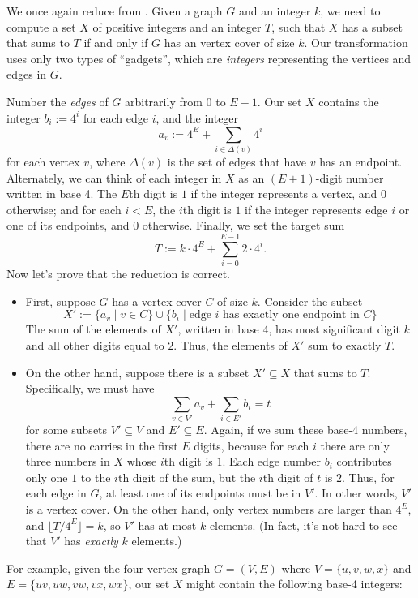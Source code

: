 We once again reduce from .
Given a graph $G$ and an integer $k$, we need to compute a set $X$ of positive integers and an integer $T$, such that $X$ has a subset that sums to $T$ if and only if $G$ has an vertex cover of size $k$.
Our transformation uses only two types of “gadgets”, which are \textit{integers} representing the vertices and edges in $G$.

Number the \textit{edges} of $G$ arbitrarily from $0$ to $E-1$.
Our set $X$ contains the integer $b_i := 4^i$ for each edge $i$, and the integer
\[
a_v := 4^E + \sum_{i \in \Delta(v)} 4^i
\]
for each vertex $v$, where $\Delta(v)$ is the set of edges that have $v$ has an endpoint.
Alternately, we can think of each integer in $X$ as an $(E+1)$-digit number written in base 4.
The $E$th digit is $1$ if the integer represents a vertex, and $0$ otherwise; and for each $i < E$, the $i$th digit is $1$ if the integer represents edge $i$ or one of its endpoints, and $0$ otherwise.
Finally, we set the target sum
\[
T := k \cdot 4^E + \sum_{i=0}^{E-1} 2 \cdot 4^i.
\]
Now let’s prove that the reduction is correct.
\begin{itemize}
\item[$\Rightarrow$] First, suppose $G$ has a vertex cover $C$ of size $k$.
Consider the subset
\[
X' := \{a_v \mid v \in C\} \cup \{b_i \mid \text{edge } i \text{ has exactly one endpoint in } C\}
\]
The sum of the elements of $X'$, written in base 4, has most significant digit $k$ and all other digits equal to $2$.
Thus, the elements of $X'$ sum to exactly $T$.
\item[$\Leftarrow$] On the other hand, suppose there is a subset $X' \subseteq X$ that sums to $T$.
Specifically, we must have
\[
\sum_{v \in V'} a_v + \sum_{i \in E'} b_i = t
\]
for some subsets $V' \subseteq V$ and $E' \subseteq E$.
Again, if we sum these base-4 numbers, there are no carries in the first $E$ digits, because for each $i$ there are only three numbers in $X$ whose $i$th digit is $1$.
Each edge number $b_i$ contributes only one $1$ to the $i$th digit of the sum, but the $i$th digit of $t$ is $2$.
Thus, for each edge in $G$, at least one of its endpoints must be in $V'$.
In other words, $V'$ is a vertex cover.
On the other hand, only vertex numbers are larger than $4^E$, and $\lfloor T/4^E \rfloor = k$, so $V'$ has at most $k$ elements.
(In fact, it’s not hard to see that $V'$ has \textit{exactly} $k$ elements.)
\end{itemize}
For example, given the four-vertex graph $G = (V, E)$ where $V = \{u, v, w, x\}$ and $E = \{uv, uw, vw, vx, wx\}$, our set $X$ might contain the following base-4 integers:
